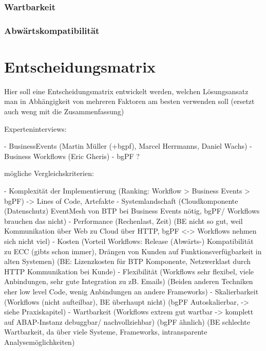 \subsubsection{Wartbarkeit}


\subsubsection{Abwärtskompatibilität}



\section{Entscheidungsmatrix}

Hier soll eine Entscheidungsmatrix entwickelt werden, welchen Lösungsansatz man in Abhängigkeit von mehreren Faktoren am besten verwenden soll (ersetzt auch weng mit die Zusammenfassung)
\newline

Experteninterviews:

- BusinessEvents (Martin Müller (+bgpf), Marcel Herrmanns, Daniel Wachs) \newline
- Business Workflows (Eric Gheris) \newline
- bgPF ?

mögliche Vergleichskriterien:

- Komplexität der Implementierung (Ranking: Workflow > Business Events > bgPF) -> Lines of Code, Artefakte \newline
- Systemlandschaft (Cloudkomponente (Datenschutz) EventMesh von BTP bei Business Events nötig, bgPF/ Workflows brauchen das nicht) \newline
- Performance (Rechenlast, Zeit) (BE nicht so gut, weil Kommunikation über Web zu Cloud über HTTP, bgPF <-> Workflows nehmen sich nicht viel) \newline
- Kosten (Vorteil Workflows: Release (Abwärts-) Kompatibilität zu ECC (gibts schon immer), Drängen von Kunden auf Funktionsverfügbarkeit in alten Systemen) (BE: Lizenzkosten für BTP Komponente, Netzwerklast durch HTTP Kommunikation bei Kunde) \newline
- Flexibilität (Workflows sehr flexibel, viele Anbindungen, sehr gute Integration zu zB. Emails) (Beiden anderen Techniken eher low level Code, wenig Anbindungen an andere Frameworks) \newline
- Skalierbarkeit (Workflows (nicht aufteilbar), BE überhaupt nicht) (bgPF Autoskalierbar, -> siehe Praxiskapitel) \newline
- Wartbarkeit (Workflows extrem gut wartbar -> komplett auf ABAP-Instanz debuggbar/ nachvollziehbar) (bgPF ähnlich) (BE schlechte Wartbarkeit, da über viele Systeme, Frameworks, intransparente Analysemöglichkeiten)
